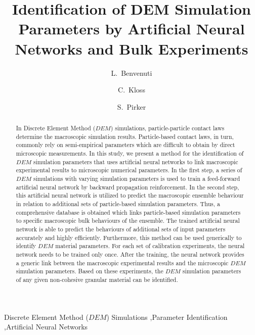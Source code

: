 \documentclass[review]{elsarticle}
\begin{document}
\begin{frontmatter}

\title{Identification of DEM Simulation Parameters by Artificial Neural Networks
and Bulk Experiments}

\author[jku]{L.~Benvenuti}

\author[dcs]{C.~Kloss}

\author[jku]{S.~Pirker}


\address[jku]{Johannes Kepler University Linz, Department on Particulate Flow
Modelling, Altenbergerstrasse 69, 4040, Linz, Austria}

\address[dcs]{DCS Computing GmbH, Altenbergerstr. 66a - Science Park, 4040 Linz,
Austria}

\begin{abstract}
In Discrete Element Method ($DEM$) simulations, particle-particle contact laws
determine the macroscopic simulation results. Particle-based contact laws, in
turn, commonly rely on semi-empirical parameters which are difficult to obtain
by direct microscopic measurements.
In this study, we present a method for the identification of
$DEM$ simulation parameters 
that uses artificial neural networks to link
macroscopic experimental results to
microscopic numerical parameters.
In the first step, a series
of $DEM$ simulations with varying simulation parameters is used to train a
feed-forward artificial neural network by backward propagation reinforcement. 
In the second step, this artificial neural network is utilized to predict the
macroscopic ensemble behaviour in relation to additional sets of particle-based
simulation parameters.
Thus, a comprehensive database is obtained
which links particle-based simulation parameters to specific macroscopic
bulk behaviours of the ensemble.
The trained artificial neural network is able to predict the behaviours of
additional sets of input parameters accurately and highly efficiently.
Furthermore, this method can be used generically to
identify $DEM$ material parameters.
For each set of calibration experiments, the neural network 
needs to be trained only once.
After the training, the neural network provides a generic link between the macroscopic 
experimental results and the microscopic $DEM$ simulation parameters.
Based on these experiments, the $DEM$ simulation parameters of any given
non-cohesive granular material can be identified.

\end{abstract}

\begin{keyword}
Discrete Element Method ($DEM$) Simulations \sep Parameter Identification \sep Artificial Neural Networks
\end{keyword}
\end{frontmatter}
\end{document}
